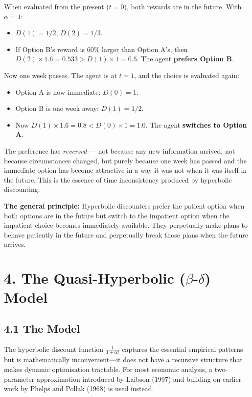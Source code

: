 \documentclass[12pt, letterpaper]{article}
\begin{document}
When evaluated from the present ($t=0$), both rewards are in the future. With $\alpha = 1$:
\begin{itemize}
\item $D(1) = 1/2$, $D(2) = 1/3$.
\item If Option B's reward is 60\% larger than Option A's, then $D(2) \times 1.6 = 0.533 > D(1) \times 1 = 0.5$. The agent \textbf{prefers Option B}.
\end{itemize}

Now one week passes. The agent is at $t=1$, and the choice is evaluated again:
\begin{itemize}
\item Option A is now immediate: $D(0) = 1$.
\item Option B is one week away: $D(1) = 1/2$.
\item Now $D(1) \times 1.6 = 0.8 < D(0) \times 1 = 1.0$. The agent \textbf{switches to Option A}.
\end{itemize}

The preference has \textit{reversed} --- not because any new information arrived, not because circumstances changed, but purely because one week has passed and the immediate option has become attractive in a way it was not when it was itself in the future. This is the essence of time inconsistency produced by hyperbolic discounting.

\textbf{The general principle:} Hyperbolic discounters prefer the patient option when both options are in the future but switch to the impatient option when the impatient choice becomes immediately available. They perpetually make plans to behave patiently in the future and perpetually break those plans when the future arrives.

\medskip


\section{4. The Quasi-Hyperbolic ($\beta$-$\delta$) Model}



\subsection{4.1 The Model}


The hyperbolic discount function $\frac{1}{1+\alpha t}$ captures the essential empirical patterns but is mathematically inconvenient---it does not have a recursive structure that makes dynamic optimisation tractable. For most economic analysis, a two-parameter approximation introduced by Laibson (1997) and building on earlier work by Phelps and Pollak (1968) is used instead.
\end{document}
